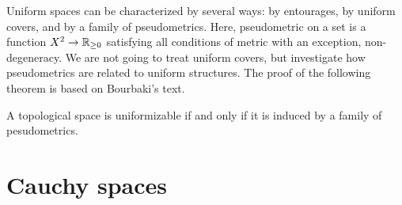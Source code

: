 \documentclass{../exp}
\begin{document}
Uniform spaces can be characterized by several ways: by entourages, by uniform covers, and by a family of pseudometrics. 
Here, pseudometric on a set is a function $X^2\to\R_{\ge0}$ satisfying all conditions of metric with an exception, non-degeneracy.
We are not going to treat uniform covers, but investigate how pseudometrics are related to uniform structures.
The proof of the following theorem is based on Bourbaki's text.%
\begin{thm}
A topological space is uniformizable if and only if it is induced by a family of pesudometrics.
\end{thm}
\begin{pf}

\end{pf}


\section{Cauchy spaces}
\end{document}
